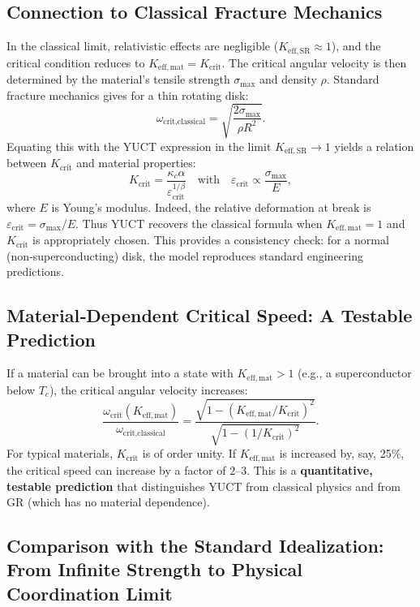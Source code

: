 \documentclass[12pt,a4paper]{article}
\newcommand{\kappac}{\kappa_c}
\newcommand{\betaf}{\beta}
\newcommand{\Keffmat}{K_{\mathrm{eff,mat}}}
\newcommand{\KeffSR}{K_{\mathrm{eff,SR}}}
\newcommand{\Kcrit}{K_{\mathrm{crit}}}
\begin{document}
	\subsection{Connection to Classical Fracture Mechanics}
	
	In the classical limit, relativistic effects are negligible (\(\KeffSR \approx 1\)), and the critical condition reduces to \(\Keffmat = \Kcrit\). The critical angular velocity is then determined by the material's tensile strength \(\sigma_{\text{max}}\) and density \(\rho\). Standard fracture mechanics gives for a thin rotating disk:
	\[
	\omega_{\text{crit,classical}} = \sqrt{\frac{2\sigma_{\text{max}}}{\rho R^2}}.
	\]
	Equating this with the YUCT expression in the limit \(\KeffSR \to 1\) yields a relation between \(\Kcrit\) and material properties:
	\[
	\Kcrit = \frac{\kappac \alpha}{\varepsilon_{\text{crit}}^{1/\betaf}} \quad \text{with} \quad \varepsilon_{\text{crit}} \propto \frac{\sigma_{\text{max}}}{E},
	\]
	where \(E\) is Young's modulus. Indeed, the relative deformation at break is \(\varepsilon_{\text{crit}} = \sigma_{\text{max}}/E\). Thus YUCT recovers the classical formula when \(\Keffmat = 1\) and \(\Kcrit\) is appropriately chosen. This provides a consistency check: for a normal (non‑superconducting) disk, the model reproduces standard engineering predictions.
	
	\subsection{Material‑Dependent Critical Speed: A Testable Prediction}
	
	If a material can be brought into a state with \(\Keffmat > 1\) (e.g., a superconductor below \(T_c\)), the critical angular velocity increases:
	\[
	\frac{\omega_{\text{crit}}(K_{\mathrm{eff,mat}})}{\omega_{\text{crit,classical}}} = \frac{ \sqrt{1 - (\Keffmat/\Kcrit)^2} }{ \sqrt{1 - (1/\Kcrit)^2} }.
	\]
	For typical materials, \(\Kcrit\) is of order unity. If \(\Keffmat\) is increased by, say, 25\%, the critical speed can increase by a factor of \(2\)–\(3\). This is a \textbf{quantitative, testable prediction} that distinguishes YUCT from classical physics and from GR (which has no material dependence).
	
	\subsection{Comparison with the Standard Idealization: From Infinite Strength to Physical Coordination Limit}
	
\end{document}

